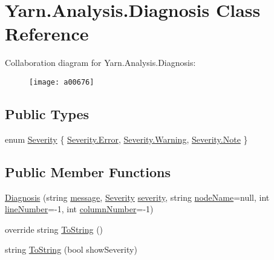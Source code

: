 \hypertarget{a00089}{\section{Yarn.\-Analysis.\-Diagnosis Class Reference}
\label{a00089}
}


Collaboration diagram for Yarn.\-Analysis.\-Diagnosis\-:
\nopagebreak
\begin{figure}[H]
\begin{center}
\leavevmode
\texttt{[image: a00676]}
\end{center}
\end{figure}
\subsection*{Public Types}
\begin{DoxyCompactItemize}
\item 
enum \hyperlink{a00089_a227813cbc8fa03c3448a612ffc909d1c}{Severity} \{ \hyperlink{a00089_a227813cbc8fa03c3448a612ffc909d1ca902b0d55fddef6f8d651fe1035b7d4bd}{Severity.\-Error}, 
\hyperlink{a00089_a227813cbc8fa03c3448a612ffc909d1ca0eaadb4fcb48a0a0ed7bc9868be9fbaa}{Severity.\-Warning}, 
\hyperlink{a00089_a227813cbc8fa03c3448a612ffc909d1ca3b0649c72650c313a357338dcdfb64ec}{Severity.\-Note}
 \}
\end{DoxyCompactItemize}
\subsection*{Public Member Functions}
\begin{DoxyCompactItemize}
\item 
\hyperlink{a00089_ad3fd818f1be98dc803e5bec959153824}{Diagnosis} (string \hyperlink{a00089_ac7ed070dddd2613c08e7874ea5afb3af}{message}, \hyperlink{a00089_a227813cbc8fa03c3448a612ffc909d1c}{Severity} \hyperlink{a00089_ad90ffa839ce0f568a099bb37b4a6c4da}{severity}, string \hyperlink{a00089_a662aca4ad2af5116c2cf6773daf1a847}{node\-Name}=null, int \hyperlink{a00089_a0bd73f1c684bfd66ae7b6bef8f2972d0}{line\-Number}=-\/1, int \hyperlink{a00089_a658e7fb05555c0f9ab5f80057bdc1408}{column\-Number}=-\/1)
\item 
override string \hyperlink{a00089_a4475eb5890c340da5c0012e25c2c86ae}{To\-String} ()
\item 
string \hyperlink{a00089_a985dee7ca27aa896332590133606b6a9}{To\-String} (bool show\-Severity)
\end{DoxyCompactItemize}
